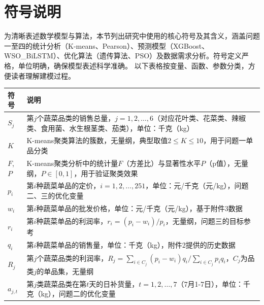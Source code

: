 \documentclass{cumcmthesis} %
\begin{document}
\section{符号说明}

为清晰表述数学模型与算法，本节列出研究中使用的核心符号及其含义，涵盖问题一至四的统计分析（K-means、Pearson）、预测模型（XGBoost、WSO\_BiLSTM）、优化算法（遗传算法、PSO）及数据需求分析。符号定义严格，单位明确，确保模型表述科学准确。
以下表格按变量、函数、参数分类，方便读者理解建模过程。

\setcounter{table}{-1} %

\begin{center}
    \begin{longtable}{p{3.5cm}<{\centering} p{10cm}<{\centering}}
        \toprule[1.5pt]
        符号 & 说明 \\
        \midrule
        \endhead %
        
        $S_j$ & 第$j$个蔬菜品类的销售总量，$j=1,2,\dots,6$（对应花叶类、花菜类、辣椒类、食用菌、水生根茎类、茄类），单位：千克（kg） \\
        
        $K$ & K-means聚类算法的簇数，无量纲，典型取值$2 \leq K \leq 10$，用于问题一单品分类 \\
        
        $F$, $P$ & K-means聚类分析中的统计量$F$（方差比）与显著性水平$P$（p值），无量纲，$P \in [0,1]$，用于验证聚类效果 \\
        
        $p_i$ & 第$i$种蔬菜单品的定价，$i=1,2,\dots,251$，单位：元/千克（元/kg），问题二、三的优化变量 \\
        
        $w_i$ & 第$i$种蔬菜单品的批发价格，单位：元/千克（元/kg），基于附件3数据 \\
        
        $r_i$ & 第$i$种蔬菜单品的利润率，$r_i = (p_i - w_i)/p_i$，无量纲，问题三的目标参考 \\
        
        $q_i$ & 第$i$种蔬菜单品的销售量，单位：千克（kg），附件2提供的历史数据 \\
        
        $R_j$ & 第$j$个蔬菜品类的利润率，$R_j = \sum_{i \in C_j} (p_i - w_i) q_i / \sum_{i \in C_j} p_i q_i$，$C_j$为品类$j$的单品集，无量纲 \\
        
        $a_{j,t}$ & 第$j$类蔬菜品类在第$t$天的日补货量，$t=1,2,\dots,7$（7月1-7日），单位：千克（kg），问题二的优化变量 \\
        

\end{longtable}
\end{center}
\end{document}
